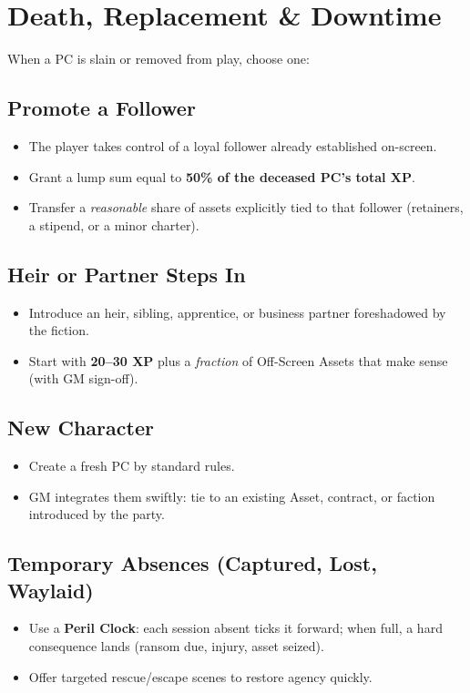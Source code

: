 \documentclass[12pt]{book}
\begin{document}
\section{Death, Replacement \& Downtime}
When a PC is slain or removed from play, choose one:

\subsection{Promote a Follower}
\begin{itemize}
  \item The player takes control of a loyal follower already established on-screen.
  \item Grant a lump sum equal to \textbf{50\% of the deceased PC's total XP}.
  \item Transfer a \textit{reasonable} share of assets explicitly tied to that follower (retainers, a stipend, or a minor charter).
\end{itemize}

\subsection{Heir or Partner Steps In}
\begin{itemize}
  \item Introduce an heir, sibling, apprentice, or business partner foreshadowed by the fiction.
  \item Start with \textbf{20–30 XP} plus a \textit{fraction} of Off-Screen Assets that make sense (with GM sign-off).
\end{itemize}

\subsection{New Character}
\begin{itemize}
  \item Create a fresh PC by standard rules.
  \item GM integrates them swiftly: tie to an existing Asset, contract, or faction introduced by the party.
\end{itemize}

\subsection{Temporary Absences (Captured, Lost, Waylaid)}
\begin{itemize}
  \item Use a \textbf{Peril Clock}: each session absent ticks it forward; when full, a hard consequence lands (ransom due, injury, asset seized).
  \item Offer targeted rescue/escape scenes to restore agency quickly.
\end{itemize}
\end{document}
